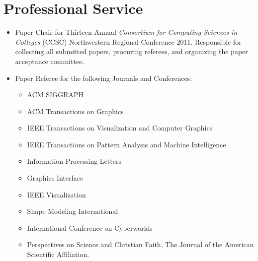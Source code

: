 \documentclass[10pt]{article}
\begin{document}


\section*{Professional Service}

\begin{itemize}
\item Paper Chair for Thirteen Annual {\em Consortium for Computing Sciences in Colleges} (CCSC)
Northwestern Regional Conference 2011. Responsible for collecting all submitted papers, procuring referees, and organizing the paper acceptance committee.

\item Paper Referee for the following Journals and Conferences:
\begin{itemize}
\item ACM SIGGRAPH
\item ACM Transactions on Graphics
\item IEEE Transactions on Visualization and Computer Graphics
\item IEEE Transactions on Pattern Analysis and Machine Intelligence
\item Information Processing Letters
\item Graphics Interface
\item IEEE Visualization
\item Shape Modeling International
\item International Conference on Cyberworlds
\item Perspectives on Science and Christian Faith, The Journal of the
  American Scientific Affiliation.
\end{itemize}
\end{itemize}



\end{document}
